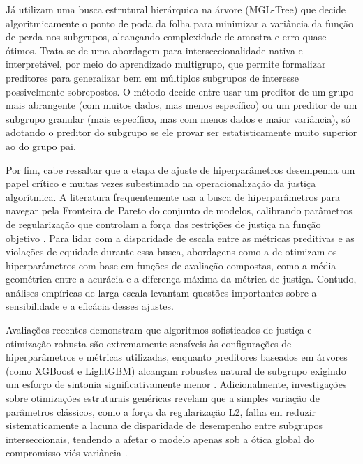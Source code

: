 Já \citet{deng2024multi} utilizam uma busca estrutural hierárquica na árvore (MGL-Tree) que decide algoritmicamente o ponto de poda da folha para minimizar a variância da função de perda nos subgrupos, alcançando complexidade de amostra e erro quase ótimos. Trata-se de uma abordagem para interseccionalidade nativa e interpretável, por meio do aprendizado multigrupo, que permite formalizar preditores para generalizar bem em múltiplos subgrupos de interesse possivelmente sobrepostos. O método decide entre usar um preditor de um grupo mais abrangente (com muitos dados, mas menos específico) ou um preditor de um subgrupo granular (mais específico, mas com menos dados e maior variância), só adotando o preditor do subgrupo se ele provar ser estatisticamente muito superior ao do grupo pai.

Por fim, cabe ressaltar que a etapa de ajuste de hiperparâmetros desempenha um papel crítico e muitas vezes subestimado na operacionalização da justiça algorítmica. A literatura frequentemente usa a busca de hiperparâmetros para navegar pela Fronteira de Pareto do conjunto de modelos, calibrando parâmetros de regularização que controlam a força das restrições de justiça na função objetivo \cite{dinh2024learning, yazdani2024fair, zhou2023fair}. Para lidar com a disparidade de escala entre as métricas preditivas e as violações de equidade durante essa busca, abordagens como a de \citet{wang2022towards} otimizam os hiperparâmetros com base em funções de avaliação compostas, como a média geométrica entre a acurácia e a diferença máxima da métrica de justiça. Contudo, análises empíricas de larga escala levantam questões importantes sobre a sensibilidade e a eficácia desses ajustes.

Avaliações recentes demonstram que algoritmos sofisticados de justiça e otimização robusta são extremamente sensíveis às configurações de hiperparâmetros e métricas utilizadas, enquanto preditores baseados em árvores (como XGBoost e LightGBM) alcançam robustez natural de subgrupo exigindo um esforço de sintonia significativamente menor \cite{gardner2022subgroup}. Adicionalmente, investigações sobre otimizações estruturais genéricas revelam que a simples variação de parâmetros clássicos, como a força da regularização L2, falha em reduzir sistematicamente a lacuna de disparidade de desempenho entre subgrupos interseccionais, tendendo a afetar o modelo apenas sob a ótica global do compromisso viés-variância \cite{gardner2023cross}.

